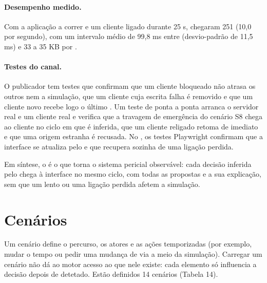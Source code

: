 \paragraph{Desempenho medido.} Com a aplicação a correr e um cliente ligado durante 25 s, chegaram
251  (10,0 por segundo), com um intervalo médio de 99,8 ms entre 
(desvio-padrão de 11,5 ms) e 33 a 35 KB por .

\paragraph{Testes do canal.} O publicador tem testes que confirmam que um cliente bloqueado não
atrasa os outros nem a simulação, que um cliente cuja escrita falha é removido e que um cliente
novo recebe logo o último . Um teste de ponta a ponta arranca o servidor real e um
cliente  real e verifica que a travagem de emergência do cenário S8 chega ao cliente
no ciclo em que é inferida, que um cliente religado retoma de imediato e que uma origem estranha é
recusada. No , os testes Playwright confirmam que a interface se atualiza pelo
 e que recupera sozinha de uma ligação perdida.

Em síntese, o  é o que torna o sistema pericial observável: cada decisão inferida
pelo  chega à interface no mesmo ciclo, com todas as propostas e a sua explicação, sem
que um  lento ou uma ligação perdida afetem a simulação.

\FloatBarrier
\section{Cenários}\label{sec:cenarios}

Um cenário define o percurso, os atores e as ações temporizadas (por exemplo, mudar o tempo ou pedir uma mudança de via a meio da simulação). Carregar um cenário não dá ao motor acesso ao que nele existe: cada elemento só influencia a decisão depois de detetado. Estão definidos 14 cenários (Tabela 14).

